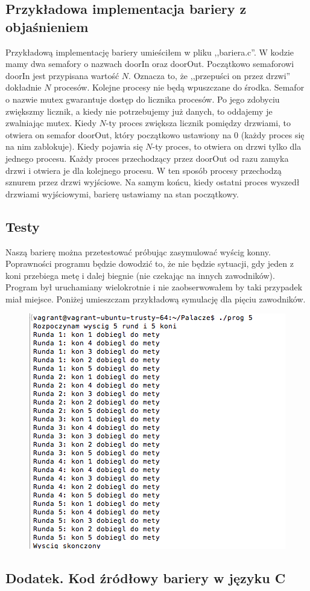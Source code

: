 \documentclass{article}
\begin{document}
\subsection*{Przykładowa implementacja bariery z objaśnieniem}
 
Przykładową implementację bariery umieściłem w pliku ,,bariera.c''. W kodzie mamy dwa semafory o nazwach doorIn oraz doorOut. Początkowo semaforowi doorIn jest przypisana wartość $N$. Oznacza to, że ,,przepuści on przez drzwi'' dokładnie $N$ procesów. Kolejne procesy nie będą wpuszczane do środka. Semafor o nazwie mutex gwarantuje dostęp do licznika procesów. Po jego zdobyciu zwiększmy licznik, a kiedy nie potrzebujemy już danych, to oddajemy je zwalniając mutex. Kiedy $N$-ty proces zwiększa licznik pomiędzy drzwiami, to otwiera on semafor doorOut, który początkowo ustawiony na $0$ (każdy proces się na nim zablokuje). Kiedy pojawia się $N$-ty proces, to otwiera on drzwi tylko dla jednego procesu. Każdy proces przechodzący przez doorOut od razu zamyka drzwi i otwiera je dla kolejnego procesu. W ten sposób procesy przechodzą sznurem przez drzwi wyjściowe. Na samym końcu, kiedy ostatni proces wyszedł drzwiami wyjściowymi, barierę ustawiamy na stan początkowy.


\subsection*{Testy}

Naszą barierę można przetestować próbując zasymulować wyścig konny. Poprawności programu będzie dowodzić to, że nie będzie sytuacji, gdy jeden z koni przebiega metę i dalej biegnie (nie czekając na innych zawodników). Program był uruchamiany wielokrotnie i nie zaobserwowałem by taki przypadek miał miejsce. Poniżej umieszczam przykładową symulację dla pięciu zawodników.

\begin{figure}[h!]
\centering
\includegraphics{wyscigscreen}	
\end{figure}

\pagebreak

\subsection*{Dodatek. Kod źródłowy bariery w języku C}

\lstset{inputencoding=utf8}

\end{document}
